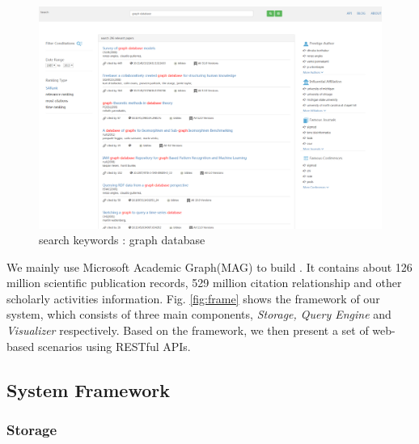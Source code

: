 \begin{figure}[tp]
\centering
\includegraphics[width=\textwidth]{searchKeywords.pdf}
\caption{search keywords : graph database}
\label{fig: search keywords}
\end{figure}

\par
We mainly use Microsoft Academic Graph(MAG) to build \oursystem \cite{sinha2015overview}. It contains about 126 million scientific publication records, 529 million citation relationship and other scholarly activities information. Fig. \ref{fig:frame} shows the framework of our system, which consists of three main components, \emph{Storage, Query Engine} and \emph{Visualizer} respectively. Based on the framework, we then present a set of web-based scenarios using RESTful APIs.

\subsection{System Framework}

\subsubsection{Storage}
\par


